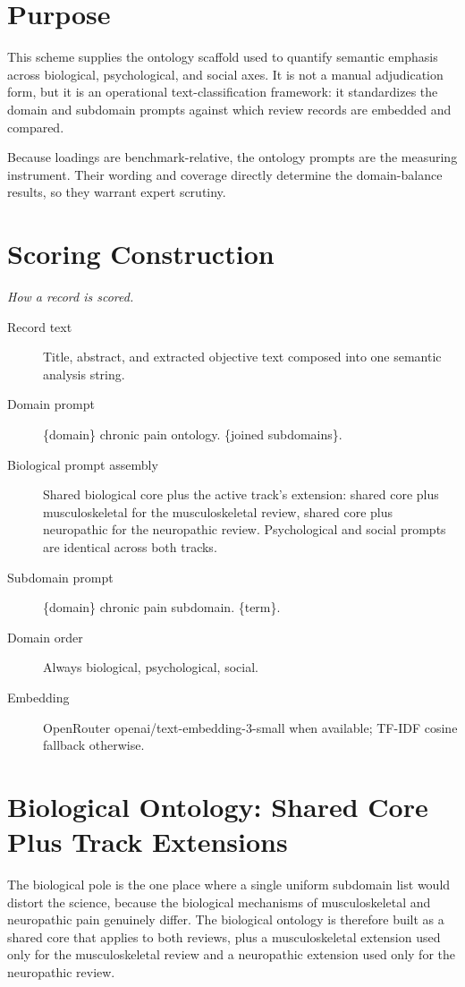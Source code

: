 \documentclass[11pt]{article}
\begin{document}
\section*{Purpose}
This scheme supplies the ontology scaffold used to quantify semantic emphasis across biological, psychological, and social axes. It is not a manual adjudication form, but it is an operational text-classification framework: it standardizes the domain and subdomain prompts against which review records are embedded and compared.

Because loadings are benchmark-relative, the ontology prompts are the measuring instrument. Their wording and coverage directly determine the domain-balance results, so they warrant expert scrutiny.


\section*{Scoring Construction}
{\small\itshape How a record is scored.}\par\smallskip
\begin{description}
\item[Record text] Title, abstract, and extracted objective text composed into one semantic analysis string.
\item[Domain prompt] \{domain\} chronic pain ontology. \{joined subdomains\}.
\item[Biological prompt assembly] Shared biological core plus the active track's extension: shared core plus musculoskeletal for the musculoskeletal review, shared core plus neuropathic for the neuropathic review. Psychological and social prompts are identical across both tracks.
\item[Subdomain prompt] \{domain\} chronic pain subdomain. \{term\}.
\item[Domain order] Always biological, psychological, social.
\item[Embedding] OpenRouter openai/text-embedding-3-small when available; TF-IDF cosine fallback otherwise.
\end{description}

\section*{Biological Ontology: Shared Core Plus Track Extensions}
The biological pole is the one place where a single uniform subdomain list would distort the science, because the biological mechanisms of musculoskeletal and neuropathic pain genuinely differ. The biological ontology is therefore built as a shared core that applies to both reviews, plus a musculoskeletal extension used only for the musculoskeletal review and a neuropathic extension used only for the neuropathic review.
\end{document}
